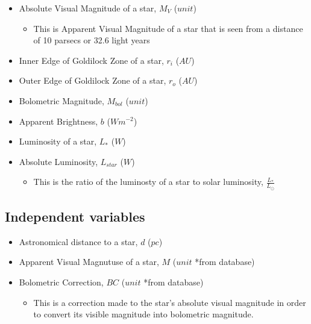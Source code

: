 \documentclass{article}
\begin{document}
  \begin{itemize}
    
  \item Absolute Visual Magnitude of a star, $M_V$ ($unit$)
    
    \begin{itemize}
      
    \item This is Apparent Visual Magnitude of a star that is seen from a distance of 10 parsecs or 32.6 light years
      
    \end{itemize}
    
  \item Inner Edge of Goldilock Zone of a star, $r_i$ ($AU$) 
    
  \item Outer Edge of Goldilock Zone of a star, $r_o$ ($AU$)
    
  \item Bolometric Magnitude, $M_{bol}$ ($unit$)
    
  \item Apparent Brightness, $b$ ($W m^{-2}$)

  \item Luminosity of a star, $L_*$ ($W$)
    
  \item Absolute Luminosity, $L_{star}$ ($W$)

    \begin{itemize}
      
    \item This is the ratio of the luminosty of a star to solar luminosity, $\frac{L_*}{L_{\odot}}$
      
    \end{itemize}
    
  \end{itemize}
  
  
  \subsection{Independent variables}
  
  \begin{itemize}
    
  \item Astronomical distance to a star, $d$ ($pc$)
    
  \item Apparent Visual Magnutuse of a star, $M$ ($unit$ *from database)
    
  \item Bolometric Correction, $BC$ ($unit$ *from database)
    
    \begin{itemize}
      
    \item This is a correction made to the star's absolute visual magnitude in order to convert its
      visible magnitude into bolometric magnitude.
      
    \end{itemize}    
    
  \end{itemize}
  
\end{document}
